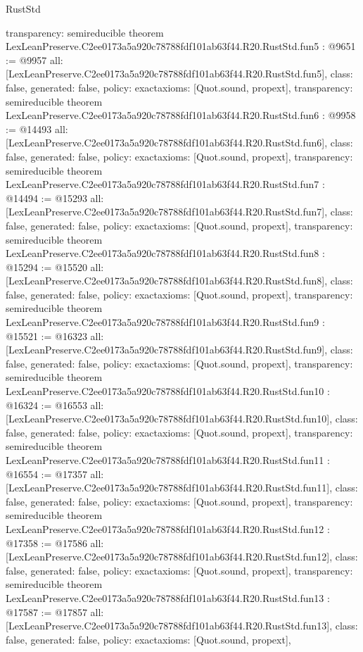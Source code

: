 \begin{lexlean}{RustStd}
\begin{coremodule}
{  transparency: semireducible
}
theorem LexLeanPreserve.C2ee0173a5a920c78788fdf101ab63f44.R20.RustStd.fun5 : @9651 := @9957 {
  all: [LexLeanPreserve.C2ee0173a5a920c78788fdf101ab63f44.R20.RustStd.fun5],
  class: false,
  generated: false,
  policy: exact{axioms: [Quot.sound, propext]},
  transparency: semireducible
}
theorem LexLeanPreserve.C2ee0173a5a920c78788fdf101ab63f44.R20.RustStd.fun6 : @9958 := @14493 {
  all: [LexLeanPreserve.C2ee0173a5a920c78788fdf101ab63f44.R20.RustStd.fun6],
  class: false,
  generated: false,
  policy: exact{axioms: [Quot.sound, propext]},
  transparency: semireducible
}
theorem LexLeanPreserve.C2ee0173a5a920c78788fdf101ab63f44.R20.RustStd.fun7 : @14494 := @15293 {
  all: [LexLeanPreserve.C2ee0173a5a920c78788fdf101ab63f44.R20.RustStd.fun7],
  class: false,
  generated: false,
  policy: exact{axioms: [Quot.sound, propext]},
  transparency: semireducible
}
theorem LexLeanPreserve.C2ee0173a5a920c78788fdf101ab63f44.R20.RustStd.fun8 : @15294 := @15520 {
  all: [LexLeanPreserve.C2ee0173a5a920c78788fdf101ab63f44.R20.RustStd.fun8],
  class: false,
  generated: false,
  policy: exact{axioms: [Quot.sound, propext]},
  transparency: semireducible
}
theorem LexLeanPreserve.C2ee0173a5a920c78788fdf101ab63f44.R20.RustStd.fun9 : @15521 := @16323 {
  all: [LexLeanPreserve.C2ee0173a5a920c78788fdf101ab63f44.R20.RustStd.fun9],
  class: false,
  generated: false,
  policy: exact{axioms: [Quot.sound, propext]},
  transparency: semireducible
}
theorem LexLeanPreserve.C2ee0173a5a920c78788fdf101ab63f44.R20.RustStd.fun10 : @16324 := @16553 {
  all: [LexLeanPreserve.C2ee0173a5a920c78788fdf101ab63f44.R20.RustStd.fun10],
  class: false,
  generated: false,
  policy: exact{axioms: [Quot.sound, propext]},
  transparency: semireducible
}
theorem LexLeanPreserve.C2ee0173a5a920c78788fdf101ab63f44.R20.RustStd.fun11 : @16554 := @17357 {
  all: [LexLeanPreserve.C2ee0173a5a920c78788fdf101ab63f44.R20.RustStd.fun11],
  class: false,
  generated: false,
  policy: exact{axioms: [Quot.sound, propext]},
  transparency: semireducible
}
theorem LexLeanPreserve.C2ee0173a5a920c78788fdf101ab63f44.R20.RustStd.fun12 : @17358 := @17586 {
  all: [LexLeanPreserve.C2ee0173a5a920c78788fdf101ab63f44.R20.RustStd.fun12],
  class: false,
  generated: false,
  policy: exact{axioms: [Quot.sound, propext]},
  transparency: semireducible
}
theorem LexLeanPreserve.C2ee0173a5a920c78788fdf101ab63f44.R20.RustStd.fun13 : @17587 := @17857 {
  all: [LexLeanPreserve.C2ee0173a5a920c78788fdf101ab63f44.R20.RustStd.fun13],
  class: false,
  generated: false,
  policy: exact{axioms: [Quot.sound, propext]},
}
\end{coremodule}
\end{lexlean}

